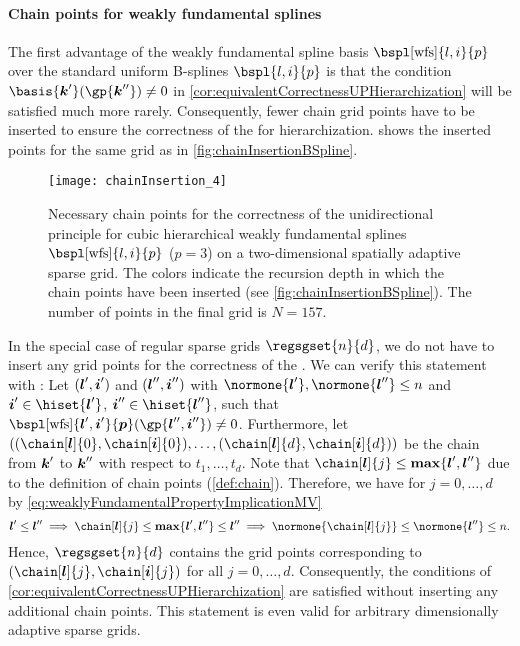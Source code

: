 \paragraph{Chain points for weakly fundamental splines}

The first advantage of the
weakly fundamental spline basis $\bspl[\wfs]{l,i}{p}$
over the standard uniform B-splines $\bspl{l,i}{p}$ is that
the condition $\basis{\*k'}(\gp{\*k''}) \not= 0$ in
\cref{cor:equivalentCorrectnessUPHierarchization} will be
satisfied much more rarely.
Consequently, fewer chain grid points have to be inserted to
ensure the correctness of the \up for hierarchization.
 shows the inserted points
for the same grid as in \cref{fig:chainInsertionBSpline}.

\begin{SCfigure}
  \texttt{[image: chainInsertion\_4]}%
  \caption[%
    Chain points for hierarchical weakly fundamental splines on a
    sparse grid%
  ]{%
    Necessary chain points for the correctness of the unidirectional principle
    for cubic hierarchical weakly fundamental splines
    $\bspl[\wfs]{l,i}{p}$ ($p = 3$)
    on a two-dimensional spatially adaptive sparse grid.
    The colors indicate the recursion depth in which the
    chain points have been inserted (see \cref{fig:chainInsertionBSpline}).
    The number of points in the final grid is $N = 157$.%
  }%
  \label{fig:chainInsertionWeaklyFundamentalSpline}%
\end{SCfigure}

In the special case of regular sparse grids $\regsgset{n}{d}$,
we do not have to insert any grid points for the correctness of the \up.
We can verify this statement with
:
Let $({\boldsymbol{l}}',{\boldsymbol{i}}')$ and $({\boldsymbol{l}}'',{\boldsymbol{i}}'')$ with
$\normone{\*l'}, \normone{\*l''} \le n$ and
$\*i' \in \hiset{\*l'}$, $\*i'' \in \hiset{\*l''}$,
such that $\bspl[\wfs]{\*l',\*i'}{\*p}(\gp{\*l'',\*i''}) \not= 0$.
Furthermore, let $((\chain[\*l]{0}, \chain[\*i]{0}), \dotsc,
(\chain[\*l]{d}, \chain[\*i]{d}))$ be the chain
from ${\boldsymbol{k}}'$ to ${\boldsymbol{k}}''$ with respect to $t_1, \dotsc, t_d$.
Note that $\chain[\*l]{j} \le \vecmax\{\*l', \*l''\}$ due to the
definition of chain points (\cref{def:chain}).
Therefore, we have for $j = 0, \dotsc, d$
by \eqref{eq:weaklyFundamentalPropertyImplicationMV}
\begin{equation}
  \*l' \le \*l''
  \implies
  \chain[\*l]{j} \le \vecmax\{\*l', \*l''\} \le \*l''
  \implies
  \normone{\chain[\*l]{j}} \le \normone{\*l''} \le n.
\end{equation}
Hence, $\regsgset{n}{d}$ contains the grid points corresponding to
$(\chain[\*l]{j}, \chain[\*i]{j})$ for all $j = 0, \dotsc, d$.
Consequently, the conditions of
\cref{cor:equivalentCorrectnessUPHierarchization} are satisfied without
inserting any additional chain points.
This statement is even valid for arbitrary
dimensionally adaptive sparse grids.



